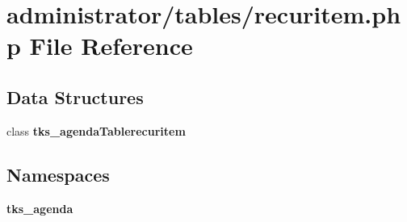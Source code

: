 \section{administrator/tables/recuritem.php File Reference}
\label{tables_2recuritem_8php}
\subsection*{Data Structures}
\begin{DoxyCompactItemize}
\item 
class \textbf{ tks\+\_\+agenda\+Tablerecuritem}
\end{DoxyCompactItemize}
\subsection*{Namespaces}
\begin{DoxyCompactItemize}
\item 
 \textbf{ tks\+\_\+agenda}
\end{DoxyCompactItemize}
